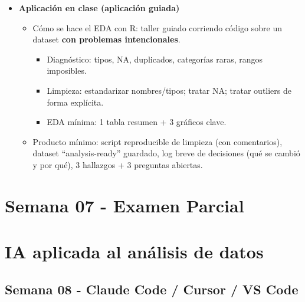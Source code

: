 \documentclass{article}
\begin{document}
\begin{itemize}
\item \textbf{Aplicación en clase (aplicación guiada)}
\begin{itemize}
  \item Cómo se hace el EDA con R: taller guiado corriendo código sobre un dataset \textbf{con problemas intencionales}.
  \begin{itemize}
    \item Diagnóstico: tipos, NA, duplicados, categorías raras, rangos imposibles.
    \item Limpieza: estandarizar nombres/tipos; tratar NA; tratar outliers de forma explícita.
    \item EDA mínima: 1 tabla resumen + 3 gráficos clave.
  \end{itemize}
  \item Producto mínimo: script reproducible de limpieza (con comentarios), dataset ``analysis-ready'' guardado, log breve de decisiones (qué se cambió y por qué), 3 hallazgos + 3 preguntas abiertas.
\end{itemize}
\end{itemize}

\newpage
\section*{Semana 07 - Examen Parcial}

\newpage
\section{IA aplicada al análisis de datos}

\subsection{Semana 08 - Claude Code / Cursor / VS Code}
\vspace{0.2 cm}

\end{document}
